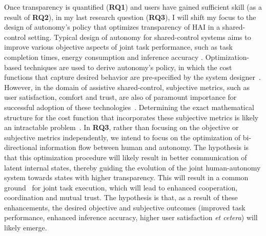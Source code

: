 \documentclass[12pt]{article}
\newcommand{\POINTS}[1]{{\textbf{\color{red}{#1}}}}
\begin{document}
Once transparency is quantified (\textbf{RQ1}) and users have gained sufficient skill (as a result of \textbf{RQ2}), in my last research question (\textbf{RQ3}), I will shift my focus to the design of autonomy's policy that optimizes transparency of HAI in a shared-control setting. Typical design of autonomy for shared-control systems aims to improve various objective aspects of joint task performance, such as task completion times, energy consumption and inference accuracy \POINTS{REFERENCE}. Optimization-based techniques are used to derive autonomy's policy, in which the cost functions that capture desired behavior are pre-specified by the system designer~\cite{javdani2015shared}. However, in the domain of assistive shared-control, subjective metrics, such as user satisfaction, comfort and trust, are also of paramount importance for successful adoption of these technologies~\cite{kim2012autonomy}. Determining the exact mathematical structure for the cost function that incorporates these subjective metrics is likely an intractable problem~\cite{gopinath2017human}. In \textbf{RQ3}, rather than focusing on the objective or subjective metrics independently, we intend to focus on the optimization of bi-directional information flow between human and autonomy. The hypothesis is that this optimization procedure will likely result in better communication of latent internal states, thereby guiding the evolution of the joint human-autonomy system towards states with higher transparency. This will result in a common ground~\cite{kiesler2005fostering} for joint task execution, which will lead to enhanced cooperation, coordination and mutual trust. The hypothesis is that, as a result of these enhancements, the desired objective and subjective outcomes (improved task performance, enhanced inference accuracy, higher user satisfaction \textit{et cetera}) will likely emerge.
\end{document}
